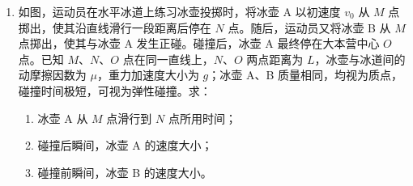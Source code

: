 \documentclass[\gkver]{gaokaozhenti}
\begin{document}
\begin{enumerate}
{（4）舍去误差较大的点，让多数点落在直线上、少数点分布在直线两侧，连线见题图。

（5）由所绘图线可知，在测量范围内，$\mathrm{L}_2$ 两端电压 $U_2$ 与其位移 $x$ 成线性关系。
}

\item
如图，运动员在水平冰道上练习冰壶投掷时，将冰壶 A 以初速度 $v_0$ 从 $M$ 点掷出，使其沿直线滑行一段距离后停在 $N$ 点。随后，运动员又将冰壶 B 从 $M$ 点掷出，使其与冰壶 A 发生正碰。碰撞后，冰壶 A 最终停在大本营中心 $O$ 点。已知 $M$、$N$、$O$ 点在同一直线上，$N$、$O$ 两点距离为 $L$，冰壶与冰道间的动摩擦因数为 $\mu$，重力加速度大小为 $g$；冰壶 A、B 质量相同，均视为质点，碰撞时间极短，可视为弹性碰撞。求：
\begin{enumerate}
	\item
	冰壶 A 从 $M$ 点滑行到 $N$ 点所用时间；
	\item
	碰撞后瞬间，冰壶 A 的速度大小；
	\item
	碰撞前瞬间，冰壶 B 的速度大小。
\end{enumerate}


\end{enumerate}
\end{document}
